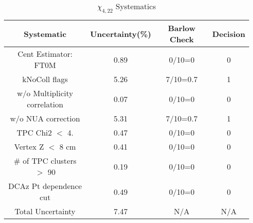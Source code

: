 \begin{table}[htbp]
\caption{$\chi_{4,22}$ Systematics}
\label{tab:Sys_chi422}
\centering
\begin{tabular}{|c|c|c|c|}
\hline
Systematic & Uncertainty(\%) & Barlow Check & Decision \\
\hline
Cent Estimator: FT0M & 0.89 & 0/10=0 & 0 \\
kNoColl flags & 5.26 & 7/10=0.7 & 1 \\
w/o Multiplicity correlation & 0.07 & 0/10=0 & 0 \\
w/o NUA correction & 5.31 & 7/10=0.7 & 1 \\
TPC Chi2 $<$ 4. & 0.47 & 0/10=0 & 0 \\
Vertex Z $<$ 8 cm & 0.41 & 0/10=0 & 0 \\
\# of TPC clusters $>$ 90 & 0.19 & 0/10=0 & 0 \\
DCAz Pt dependence cut & 0.49 & 0/10=0 & 0 \\
\hline
Total Uncertainty & 7.47 & N/A & N/A \\
\hline
\end{tabular}
\end{table}
